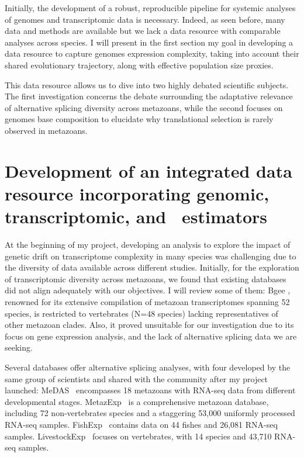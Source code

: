 Initially, the development of a robust, reproducible pipeline for systemic analyses of genomes and transcriptomic data is necessary. Indeed, as seen before, many data and methods are available but we lack a data resource with comparable analyses across species. I will present in the first section my goal in developing a data resource to capture genomes expression complexity, taking into account their shared evolutionary trajectory, along with effective population size proxies.

This data resource allows us to dive into two highly debated scientific subjects. The first investigation concerns the debate surrounding the adaptative relevance of alternative splicing diversity across metazoans, while the second focuses on genomes base composition to elucidate why translational selection is rarely observed in metazoans.


\section{Development of an integrated data resource incorporating genomic, transcriptomic, and \Ne~estimators}

At the beginning of my project, developing an analysis to explore the impact of genetic drift on transcriptome complexity in many species was challenging due to the diversity of data available across different studies. Initially, for the exploration of transcriptomic diversity across metazoans, we found that existing databases did not align adequately with our objectives. 
I will review some of them: Bgee \citep{bastian_bgee_2020}, renowned for its extensive compilation of metazoan transcriptomes spanning 52 species, is restricted to vertebrates (N=48 species) lacking representatives of other metazoan clades. Also, it proved unsuitable for our investigation due to its focus on gene expression analysis, and the lack of alternative splicing data we are seeking.

Several databases offer alternative splicing analyses, with four developed by the same group of scientists and shared with the community after my project launched: MeDAS~\citep{li_medas_2020} encompasses 18 metazoans with RNA-seq data from different developmental stages. MetazExp~\citep{liu_metazexp_2021} is a comprehensive metazoan database, including 72 non-vertebrates species and a staggering 53,000 uniformly processed RNA-seq samples. FishExp~\citep{tan_fishexp_2022} contains data on 44 fishes and 26,081 RNA-seq samples. LivestockExp~\citep{liu_web-based_2022} focuses on vertebrates, with 14 species and 43,710 RNA-seq samples. 

